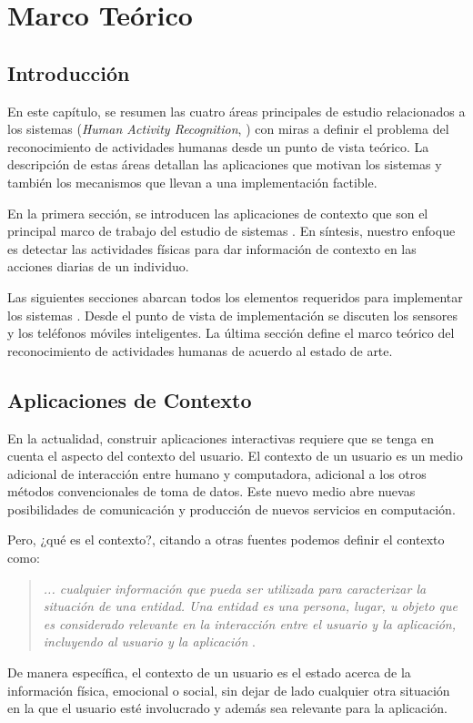 
\chapter{Marco Teórico}

\label{chap2:marco-teorico}

\section{Introducción}

\label{sec21:introduccion}En este capítulo, se resumen las cuatro
áreas principales de estudio relacionados a los sistemas (\emph{Human
Activity Recognition}, ) con miras a definir el problema
del reconocimiento de actividades humanas desde un punto de vista
teórico. La descripción de estas áreas detallan las aplicaciones que
motivan los sistemas  y también los mecanismos que llevan
a una implementación factible. 

En la primera sección, se introducen las aplicaciones de contexto
que son el principal marco de trabajo del estudio de sistemas .
En síntesis, nuestro enfoque es detectar las actividades físicas para
dar información de contexto en las acciones diarias de un individuo. 

Las siguientes secciones abarcan todos los elementos requeridos para
implementar los sistemas . Desde el punto de vista de implementación
se discuten los sensores y los teléfonos móviles inteligentes. La
última sección define el marco teórico del reconocimiento de actividades
humanas de acuerdo al estado de arte.

\section{Aplicaciones de Contexto}

\label{sec22:contexto}En la actualidad, construir aplicaciones interactivas
requiere que se tenga en cuenta el aspecto del contexto del usuario.
El contexto de un usuario es un medio adicional de interacción entre
humano y computadora, adicional a los otros métodos convencionales
de toma de datos. Este nuevo medio abre nuevas posibilidades de comunicación
y producción de nuevos servicios en computación. 

Pero, ¿qué es el contexto?, citando a otras fuentes podemos definir
el contexto como: 
\begin{quotation}
\flqq{}\emph{... cualquier información que pueda ser utilizada para
caracterizar la situación de una entidad. Una entidad es una persona,
lugar, u objeto que es considerado relevante en la interacción entre
el usuario y la aplicación, incluyendo al usuario y la aplicación}\frqq{}
\cite{Dey2000}. 
\end{quotation}
De manera específica, el contexto de un usuario es el estado acerca
de la información física, emocional o social, sin dejar de lado cualquier
otra situación en la que el usuario esté involucrado y además sea
relevante para la aplicación.

